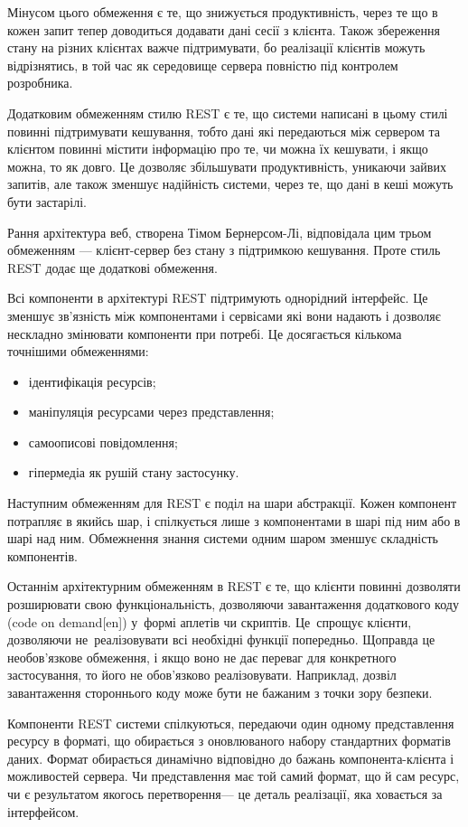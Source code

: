 \documentclass[../main.tex]{subfiles}
\begin{document}
Мінусом цього обмеження є те, що знижується продуктивність, через те що в кожен запит тепер доводиться додавати дані сесії з клієнта. Також збереження стану на різних клієнтах важче підтримувати, бо реалізації клієнтів можуть відрізнятись, в той час як середовище сервера повністю під контролем розробника.

Додатковим обмеженням стилю REST є те, що системи написані в цьому стилі повинні підтримувати кешування, тобто дані які передаються між сервером та клієнтом повинні містити інформацію про те, чи можна їх кешувати, і якщо можна, то як довго. Це дозволяє збільшувати продуктивність, уникаючи зайвих запитів, але також зменшує надійність системи, через те, що дані в кеші можуть бути застарілі.

Рання архітектура веб, створена Тімом Бернерсом-Лі, відповідала цим трьом обмеженням — клієнт-сервер без стану з підтримкою кешування. Проте стиль REST додає ще додаткові обмеження.

Всі компоненти в архітектурі REST підтримують однорідний інтерфейс. Це зменшує зв'язність між компонентами і сервісами які вони надають і дозволяє нескладно змінювати компоненти при потребі. Це досягається кількома точнішими обмеженнями:

\begin{itemize}
	\item ідентифікація ресурсів;
	\item маніпуляція ресурсами через представлення;
	\item самоописові повідомлення;
	\item гіпермедіа як рушій стану застосунку.
\end{itemize}

Наступним обмеженням для REST є поділ на шари абстракції. Кожен компонент потрапляє в якийсь шар, і спілкується лише з компонентами в шарі під ним або в шарі над ним. Обмежнення знання системи одним шаром зменшує складність компонентів.

Останнім архітектурним обмеженням в REST є те, що клієнти повинні дозволяти розширювати свою функціональність, дозволяючи завантаження додаткового коду (code on demand[en]) у~формі аплетів чи скриптів. Це~спрощує клієнти, дозволяючи не~реалізовувати всі необхідні функції попередньо. Щоправда це необов'язкове обмеження, і якщо воно не дає переваг для конкретного застосування, то його не обов'язково реалізовувати. Наприклад, дозвіл завантаження стороннього коду може бути не бажаним з точки зору безпеки.

Компоненти REST системи спілкуються, передаючи один одному представлення ресурсу в форматі, що обирається з оновлюваного набору стандартних форматів даних. Формат обирається динамічно відповідно до бажань компонента-клієнта і можливостей сервера. Чи представлення має той самий формат, що й сам ресурс, чи є результатом якогось перетворення\nolinebreak[2] — це деталь реалізації, яка ховається за інтерфейсом.
\end{document}
